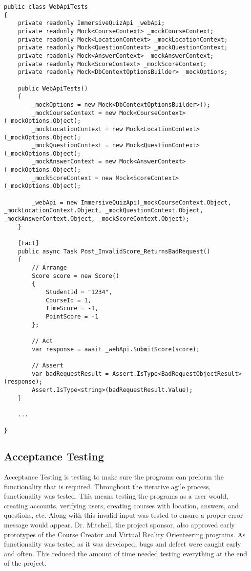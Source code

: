 \begin{lstlisting}[caption=Example Unit Test,label=lst:UnitTest]
public class WebApiTests
{
	private readonly ImmersiveQuizApi _webApi;
	private readonly Mock<CourseContext> _mockCourseContext;
	private readonly Mock<LocationContext> _mockLocationContext;
	private readonly Mock<QuestionContext> _mockQuestionContext;
	private readonly Mock<AnswerContext> _mockAnswerContext;
	private readonly Mock<ScoreContext> _mockScoreContext;
	private readonly Mock<DbContextOptionsBuilder> _mockOptions;
	
	public WebApiTests()
	{
		_mockOptions = new Mock<DbContextOptionsBuilder>();
		_mockCourseContext = new Mock<CourseContext>(_mockOptions.Object);
		_mockLocationContext = new Mock<LocationContext>(_mockOptions.Object);
		_mockQuestionContext = new Mock<QuestionContext>(_mockOptions.Object);
		_mockAnswerContext = new Mock<AnswerContext>(_mockOptions.Object);
		_mockScoreContext = new Mock<ScoreContext>(_mockOptions.Object);
		
		_webApi = new ImmersiveQuizApi(_mockCourseContext.Object, _mockLocationContext.Object, _mockQuestionContext.Object, _mockAnswerContext.Object, _mockScoreContext.Object);
	}
	
	[Fact]
	public async Task Post_InvalidScore_ReturnsBadRequest()
	{
		// Arrange
		Score score = new Score()
		{
			StudentId = "1234",
			CourseId = 1,
			TimeScore = -1,
			PointScore = -1
		};
		
		// Act
		var response = await _webApi.SubmitScore(score);
		
		// Assert
		var badRequestResult = Assert.IsType<BadRequestObjectResult>(response);
		Assert.IsType<string>(badRequestResult.Value);
	} 
	
	...
	
}
\end{lstlisting}

\subsection{Acceptance Testing}
Acceptance Testing is testing to make sure the programs can preform the functionality that is required. Throughout the iterative agile process, functionality was tested. This means testing the programs as a user would, creating accounts, verifying users, creating courses with location, answers, and questions, etc. Along with this invalid input was tested to ensure a proper error message would appear. Dr. Mitchell, the project sponsor, also approved early prototypes of the Course Creator and Virtual Reality Orienteering programs.  As functionality was tested as it was developed, bugs and defect were caught early and often. This reduced the amount of time needed testing everything at the end of the project.

